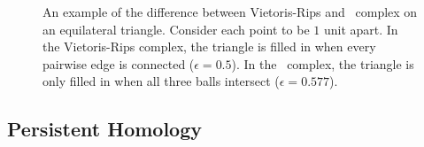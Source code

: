 \begin{figure}
  \centering
  \caption[Vietoris-Ripps and \Cech Complexes]{An example of the difference between Vietoris-Rips and \Cech\ complex on an equilateral triangle. Consider each point to be $1$ unit apart. In the Vietoris-Rips complex, the triangle is filled in when every pairwise edge is connected ($\epsilon=0.5$). In the \Cech\ complex, the triangle is only filled in when all three balls intersect ($\epsilon=0.577$).}
  \label{fig:bg:triangle_complexes}
\end{figure}
	
\subsection{Persistent Homology}
\label{bg:tda:ph}


